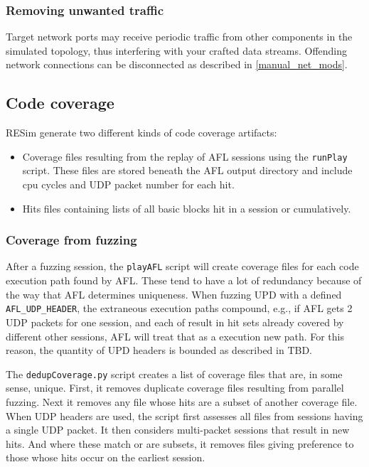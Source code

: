 \documentclass[titlepage]{article}
\begin{document}
\subsubsection{Removing unwanted traffic}
Target network ports may receive periodic traffic from other components in the simulated topology, thus interfering with your crafted data streams.
Offending network connections can be disconnected as described in \ref{manual_net_mods}.


\subsection{Code coverage}
\label{coverage}
RESim generate two different kinds of code coverage artifacts:
\begin{itemize}
\item Coverage files resulting from the replay of AFL sessions using the {\tt runPlay} script.  These files are stored beneath the AFL output directory
and include cpu cycles and UDP packet number for each hit. 
\item Hits files containing lists of all basic blocks hit in a session or cumulatively.
\end{itemize}
\subsubsection{Coverage from fuzzing}
After a fuzzing session, the {\tt playAFL} script will create coverage files for each code execution path found by AFL.  These tend to have a lot of
redundancy because of the way that AFL determines uniqueness.  When fuzzing UPD with a defined {\tt AFL\_UDP\_HEADER}, the extraneous execution paths compound,
e.g., if AFL gets 2 UDP packets for one session, and each of result in hit sets already covered by different other sessions, AFL will treat that as a execution
new path.  For this reason, the quantity of UPD headers is bounded as described in TBD.  

The {\tt dedupCoverage.py} script creates a list of coverage files that are, in some sense, unique.  First, it removes duplicate coverage files resulting from
parallel fuzzing.  Next it removes any file whose hits are a subset of another coverage file.  When UDP headers are used, the script first assesses all files from
sessions having a single UDP packet.  It then considers multi-packet sessions that result in new hits.  And where these match or are subsets, it removes files 
giving preference to those whose hits occur on the earliest session.
\end{document}
